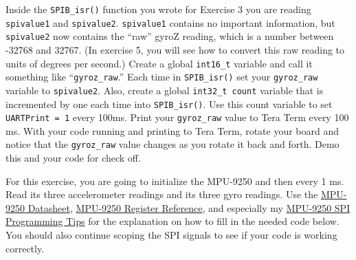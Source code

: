 \documentclass[11pt]{article}
\begin{document}
Inside the \texttt{SPIB_isr()} function you wrote for Exercise 3 you are reading \texttt{spivalue1} and \texttt{spivalue2}.  \texttt{spivalue1} contains no important information, but \texttt{spivalue2} now contains the “raw” gyroZ reading, which is a number between -32768 and 32767. (In exercise 5, you will see how to convert this raw reading to units of degrees per second.)  Create a global \texttt{int16_t} variable and call it something like “\texttt{gyroz_raw}.”  Each time in \texttt{SPIB_isr()} set your \texttt{gyroz_raw} variable to \texttt{spivalue2}. Also, create a global \texttt{int32_t count} variable that is incremented by one each time into \texttt{SPIB_isr()}. Use this count variable to set \texttt{UARTPrint = 1} every 100ms. Print your \texttt{gyroz_raw} value to Tera Term every 100 ms. With your code running and printing to Tera Term, rotate your board and notice that the \texttt{gyroz_raw} value changes as you rotate it back and forth. Demo this and your code for check off.


For this exercise, you are going to initialize the MPU-9250 and then every 1 ms. Read its three accelerometer readings and its three gyro readings. Use the \href{http://coecsl.ece.illinois.edu/se423/PS-MPU-9250A-01-v1.1.pdf}{MPU-9250 Datasheet},  \href{http://coecsl.ece.illinois.edu/se423/MPU-9250-Register-Map.pdf}{MPU-9250 Register Reference}, and especially my \href{http://coecsl.ece.illinois.edu/se423/MPU-9250-Addendum.pdf}{MPU-9250 SPI Programming Tips} for the explanation on how to fill in the needed code below. You should also continue scoping the SPI signals to see if your code is working correctly.
\end{document}
